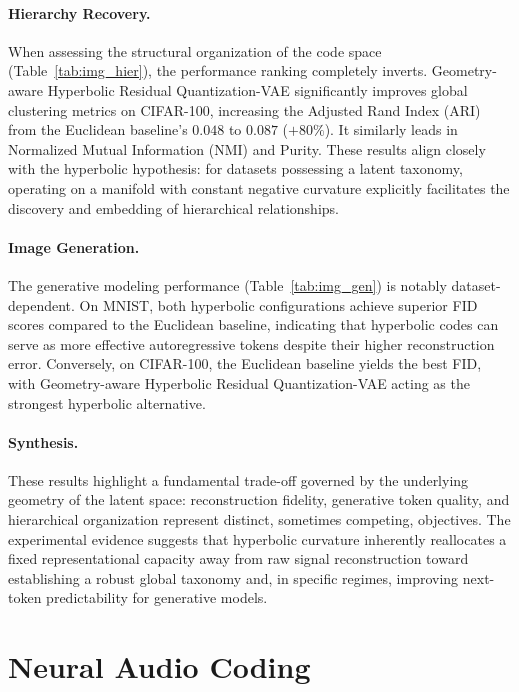 \documentclass[12pt]{report}
\begin{document}
\paragraph{Hierarchy Recovery.}
When assessing the structural organization of the code space (Table~\ref{tab:img_hier}), the performance ranking completely inverts. Geometry-aware Hyperbolic Residual Quantization-VAE significantly improves global clustering metrics on CIFAR-100, increasing the Adjusted Rand Index (ARI) from the Euclidean baseline's $0.048$ to $0.087$ ($+80\%$). It similarly leads in Normalized Mutual Information (NMI) and Purity. These results align closely with the hyperbolic hypothesis: for datasets possessing a latent taxonomy, operating on a manifold with constant negative curvature explicitly facilitates the discovery and embedding of hierarchical relationships.

\paragraph{Image Generation.}
The generative modeling performance (Table~\ref{tab:img_gen}) is notably dataset-dependent. On MNIST, both hyperbolic configurations achieve superior FID scores compared to the Euclidean baseline, indicating that hyperbolic codes can serve as more effective autoregressive tokens despite their higher reconstruction error. Conversely, on CIFAR-100, the Euclidean baseline yields the best FID, with Geometry-aware Hyperbolic Residual Quantization-VAE acting as the strongest hyperbolic alternative.

\paragraph{Synthesis.}
These results highlight a fundamental trade-off governed by the underlying geometry of the latent space: reconstruction fidelity, generative token quality, and hierarchical organization represent distinct, sometimes competing, objectives. The experimental evidence suggests that hyperbolic curvature inherently reallocates a fixed representational capacity away from raw signal reconstruction toward establishing a robust global taxonomy and, in specific regimes, improving next-token predictability for generative models.

\section{Neural Audio Coding}
\label{sec:exp_audio}
\end{document}
